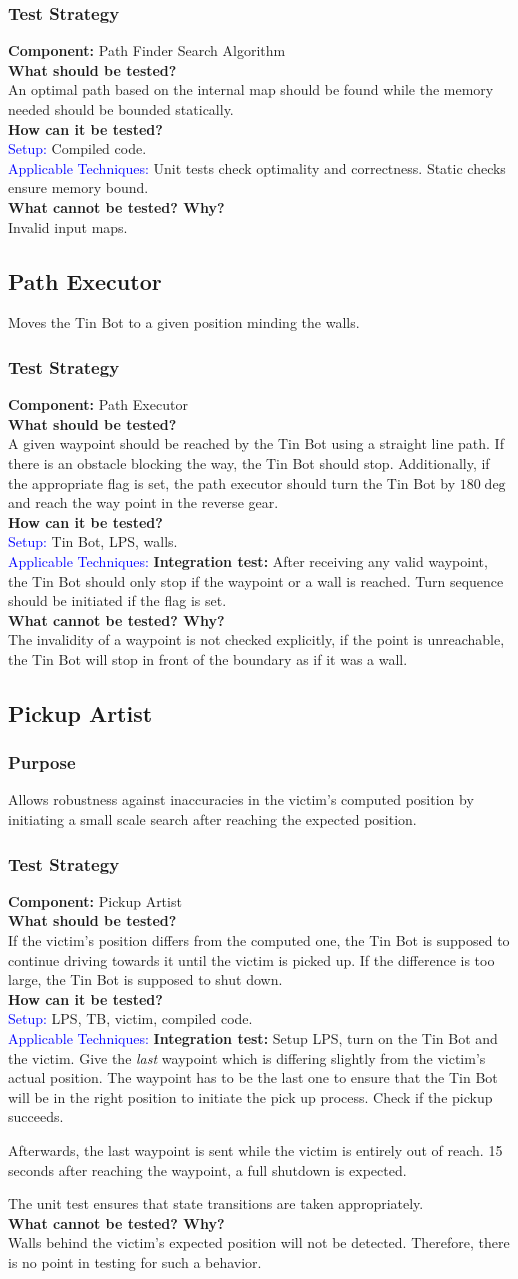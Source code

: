\documentclass[a4paper,parskip,headheight=38pt]{scrartcl} %
\newcommand{\teststrat}[5]{
    \subsubsection{Test Strategy}
	\textbf{Component:} #1 \\
	\noindent\textbf{What should be tested?} \\
    \noindent #2 \\
	\noindent\textbf{How can it be tested?} \\
    \noindent\textcolor{blue}{Setup:} #3 \\
    \noindent\textcolor{blue}{Applicable Techniques:} #4 \\
	\noindent\textbf{What cannot be tested? Why?} \\
    \noindent #5
}
\newcommand{\BLACK}{\textbf{Integration test: }}
\begin{document}
\teststrat{Path Finder Search Algorithm}{
    An optimal path based on the internal map should be found while the memory
    needed should be bounded statically.
}{
    Compiled code.
}{
    Unit tests check optimality and correctness. Static checks ensure memory
    bound.
}{
    Invalid input maps.
}

\subsection{Path Executor}
Moves the Tin Bot to a given position minding the walls.
\teststrat{Path Executor}{
    A given waypoint should be reached by the Tin Bot using a straight line
    path. If there is an obstacle blocking the way, the Tin Bot should stop.
    Additionally, if the appropriate flag is set, the path executor should turn
    the Tin Bot by $180\deg$ and reach the way point in the reverse gear.
}{
    Tin Bot, LPS, walls.
}{
    \BLACK After receiving any valid waypoint, the Tin Bot should
    only stop if the waypoint or a wall is reached. Turn sequence should be
    initiated if the flag is set.
}{
    The invalidity of a waypoint is not checked explicitly, if the point is
    unreachable, the Tin Bot will stop in front of the boundary as if it was a
    wall.
}

\subsection{Pickup Artist}
\subsubsection{Purpose}
Allows robustness against inaccuracies in the victim's computed position by
initiating a small scale search after reaching the expected position.
\teststrat{Pickup Artist}{
    If the victim's position differs from the computed one, the Tin Bot is
    supposed to continue driving towards it until the victim is picked up. If
    the difference is too large, the Tin Bot is supposed to shut down.
}{
    LPS, TB, victim, compiled code.
}{
    \BLACK Setup LPS, turn on the Tin Bot and the victim. Give the
    \emph{last} waypoint which is differing slightly from the victim's actual
    position. The waypoint has to be the last one to ensure that the Tin Bot
    will be in the right position to initiate the pick up process. Check if the
    pickup succeeds.

    Afterwards, the last waypoint is sent while the victim is entirely out of
    reach. 15 seconds after reaching the waypoint, a full shutdown is expected.

    The unit test ensures that state transitions are taken appropriately.
}{
    Walls behind the victim's expected position will not be detected. Therefore,
    there is no point in testing for such a behavior.
}
\end{document}
